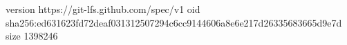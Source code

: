 version https://git-lfs.github.com/spec/v1
oid sha256:ed631623fd72deaf031312507294c6cc9144606a8e6e217d26335683665d9e7d
size 1398246
